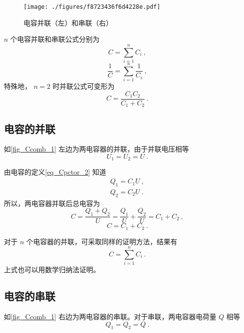 

\begin{figure}[ht]
\centering
\texttt{[image: ./figures/f8723436f6d4228e.pdf]}
\caption{电容并联（左）和串联（右）} \label{fig_Ccomb_1}
\end{figure}

$n$ 个电容并联和串联公式分别为
\begin{equation}
C=\sum_{i=1}^{n}C_i~,
\end{equation}
\begin{equation}
\frac{1}{C}=\sum_{i=1}^{n}\frac{1}{C_i}~,
\end{equation}
特殊地， $n = 2$ 时并联公式可变形为
\begin{equation}
C = \frac{C_1 C_2}{C_1 + C_2}~.
\end{equation}


\subsection{电容的并联}
如\autoref{fig_Ccomb_1} 左边为两电容器的并联，由于并联电压相等
\begin{equation}
U_1=U_2=U~.
\end{equation}

由电容的定义\autoref{eq_Cpctor_2} 知道
\begin{equation}
\begin{aligned}
Q_1=C_1U~,\\
Q_2=C_2U~.
\end{aligned}
\end{equation}
所以，两电容器并联后总电容为
\begin{equation}
C=\frac{Q_1+Q_2}{U}=\frac{Q_1}{U}+\frac{Q_2}{U}=C_1+C_2~,
\end{equation}
\begin{equation}
C = C_1 + C_2~.
\end{equation}

对于 $n$ 个电容器的并联，可采取同样的证明方法，结果有
\begin{equation}
C=\sum_{i=1}^{n}C_i~.
\end{equation}
上式也可以用数学归纳法证明。

\subsection{电容的串联}
如\autoref{fig_Ccomb_1} 右边为两电容器的串联。对于串联，两电容器电荷量 $Q$ 相等
\begin{equation}
Q_1=Q_2=Q~.
\end{equation}

